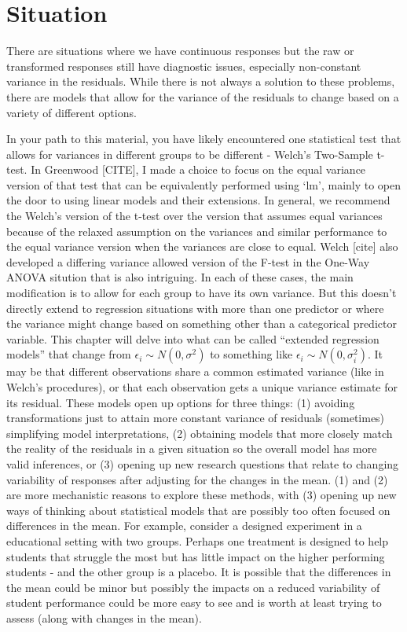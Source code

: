 \documentclass[
]{book}
\begin{document}
\hypertarget{section6-1}{%
\section{Situation}\label{section6-1}}

There are situations where we have continuous responses but the raw or transformed responses still have diagnostic issues, especially non-constant variance in the residuals. While there is not always a solution to these problems, there are models that allow for the variance of the residuals to change based on a variety of different options.

In your path to this material, you have likely encountered one statistical test that allows for variances in different groups to be different - Welch's Two-Sample t-test. In Greenwood {[}CITE{]}, I made a choice to focus on the equal variance version of that test that can be equivalently performed using `lm', mainly to open the door to using linear models and their extensions. In general, we recommend the Welch's version of the t-test over the version that assumes equal variances because of the relaxed assumption on the variances and similar performance to the equal variance version when the variances are close to equal. Welch {[}cite{]} also developed a differing variance allowed version of the F-test in the One-Way ANOVA sitution that is also intriguing. In each of these cases, the main modification is to allow for each group to have its own variance. But this doesn't directly extend to regression situations with more than one predictor or where the variance might change based on something other than a categorical predictor variable. This chapter will delve into what can be called ``extended regression models'' that change from \(\epsilon_i \sim N(0, \sigma^2)\) to something like \(\epsilon_i \sim N(0, \sigma_i^2)\). It may be that different observations share a common estimated variance (like in Welch's procedures), or that each observation gets a unique variance estimate for its residual. These models open up options for three things: (1) avoiding transformations just to attain more constant variance of residuals (sometimes) simplifying model interpretations, (2) obtaining models that more closely match the reality of the residuals in a given situation so the overall model has more valid inferences, or (3) opening up new research questions that relate to changing variability of responses after adjusting for the changes in the mean. (1) and (2) are more mechanistic reasons to explore these methods, with (3) opening up new ways of thinking about statistical models that are possibly too often focused on differences in the mean. For example, consider a designed experiment in a educational setting with two groups. Perhaps one treatment is designed to help students that struggle the most but has little impact on the higher performing students - and the other group is a placebo. It is possible that the differences in the mean could be minor but possibly the impacts on a reduced variability of student performance could be more easy to see and is worth at least trying to assess (along with changes in the mean).
\end{document}
